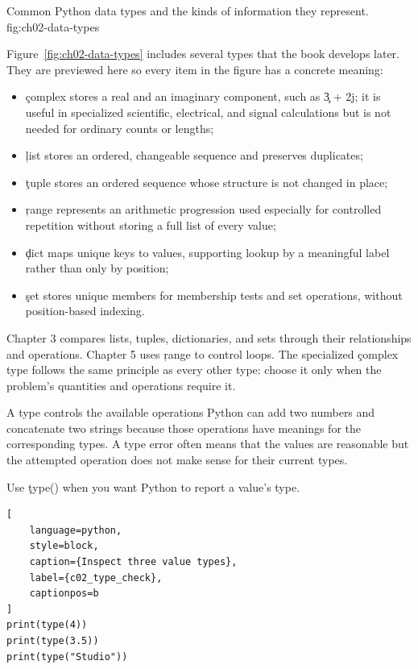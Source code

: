 {Common Python data types and the kinds of information they represent.}
{fig:ch02-data-types}

Figure~\ref{fig:ch02-data-types} includes several types that the book develops
later. They are previewed here so every item in the figure has a concrete
meaning:
\begin{itemize}
    \item \c{complex} stores a real and an imaginary component, such as
          \c{3 + 2j}; it is useful in specialized scientific, electrical, and
          signal calculations but is not needed for ordinary counts or lengths;
    \item \c{list} stores an ordered, changeable sequence and preserves
          duplicates;
    \item \c{tuple} stores an ordered sequence whose structure is not changed
          in place;
    \item \c{range} represents an arithmetic progression used especially for
          controlled repetition without storing a full list of every value;
    \item \c{dict} maps unique keys to values, supporting lookup by a meaningful
          label rather than only by position;
    \item \c{set} stores unique members for membership tests and set operations,
          without position-based indexing.
\end{itemize}

Chapter 3 compares lists, tuples, dictionaries, and sets through their
relationships and operations. Chapter 5 uses \c{range} to control loops. The
specialized \c{complex} type follows the same principle as every other type:
choose it only when the problem's quantities and operations require it.

\begin{ExplainBox}{A type controls the available operations}
Python can add two numbers and concatenate two strings because those
operations have meanings for the corresponding types. A type error often
means that the values are reasonable but the attempted operation does not
make sense for their current types.
\end{ExplainBox}

Use \c{type()} when you want Python to report a value's type.

\begin{lstlisting}[
    language=python,
    style=block,
    caption={Inspect three value types},
    label={c02_type_check},
    captionpos=b
]
print(type(4))
print(type(3.5))
print(type("Studio"))
\end{lstlisting}

